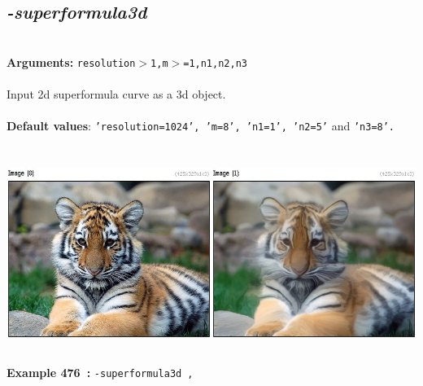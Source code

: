 \documentclass[a4paper,11pt,twoside]{book}
\begin{document}
\subsection{\emph{-superformula3d} }\vspace*{-0.5em}
~\\\textbf{Arguments: } 
{\small \texttt{resolution$>$1,m$>$=1,n1,n2,n3}}\\~\\
Input 2d superformula curve as a 3d object.
~\\~\\\textbf{Default values}: {\small \texttt{'resolution=1024', 'm=8', 'n1=1', 'n2=5'} and \texttt{'n3=8'.}}
\begin{center}\includegraphics[keepaspectratio=true,height=7cm,width=\textwidth]{img/gmic_def476.jpg}\\
{\footnotesize \textbf{Example 476~:} \texttt{-superformula3d ,}}
\end{center}
\end{document}
